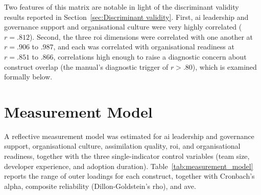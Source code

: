 Two features of this matrix are notable in light of the discriminant validity results reported in Section~\ref{sec:Discriminant validity}. First, \gls{ai} leadership and governance support and organisational culture were very highly correlated ($r = .812$). Second, the three \gls{roi} dimensions were correlated with one another at $r = .906$ to $.987$, and each was correlated with organisational readiness at $r = .851$ to $.866$, correlations high enough to raise a diagnostic concern about construct overlap (the manual's diagnostic trigger of $r > .80$), which is examined formally below.

\section{Measurement Model}
\label{sec:Measurement Model}
A reflective measurement model was estimated for \gls{ai} leadership and governance support, organisational culture, assimilation quality, \gls{roi}, and organisational readiness, together with the three single-indicator control variables (team size, developer experience, and adoption duration). Table~\ref{tab:measurement_model} reports the range of outer loadings for each construct, together with Cronbach's alpha, composite reliability (Dillon-Goldstein's rho), and \gls{ave}.

\begin{table}[htbp]
	\centering
	\caption{Measurement model: outer loadings, reliability, and convergent validity}
	\label{tab:measurement_model}
\end{table}

